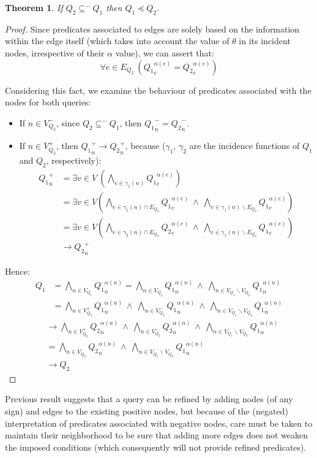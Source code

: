 \documentclass[mathematics,article,submit,pdftex,moreauthors]{Definitions/mdpi}
\newtheorem{theorem}{Theorem}
\begin{document}
\begin{theorem}{}
    If $Q_2\subseteq^- Q_1$ then $Q_1\preceq Q_2$.
\end{theorem}
\begin{proof}{}
	Since predicates associated to edges are solely based on the information within the edge itself (which takes into account the value of $\theta$ in its incident nodes, irrespective of their $\alpha$ value), we can assert that:
	$$\forall e\in E_{Q_2}\ ({Q_1}_e^{\alpha(e)}={Q_2}_e^{\alpha(e)})$$
	
	Considering this fact, we examine the behaviour of predicates associated with the nodes for both queries:
	\begin{itemize}
		\item If  $n\in V_{Q_2}^-$, since $Q_2\subseteq^- Q_1$, then ${Q_1}_n^-={Q_2}_n^-$.
		\item If $n\in V_{Q_2}^+$, then ${Q_1}_n^+\rightarrow {Q_2}_n^+$, because ($\gamma_1$, $\gamma_2$ are the incidence functions of $Q_1$ and $Q_2$, respectively):
		\begin{align*}
		{Q_1}_n^+   &= \exists v\in V\ \left( \bigwedge_{e\in \gamma_1(n)} {Q_1}_e^{\alpha(e)}\right)\\
		&= \exists v\in V\left( \bigwedge_{e\in \gamma_1(n)\cap E_{Q_2}} {Q_1}_e^{\alpha(e)}\ \wedge \ \bigwedge_{e\in \gamma_1(n)\smallsetminus E_{Q_2}} {Q_1}_e^{\alpha(e)}\right)\\
		&= \exists v\in V\left( \bigwedge_{e\in \gamma_2(n)\cap E_{Q_2}} {Q_2}_e^{\alpha(e)}\ \wedge \ \bigwedge_{e\in \gamma_1(n)\smallsetminus E_{Q_2}} {Q_1}_e^{\alpha(e)}\right)\\
		&\rightarrow {Q_2}_n^+
		\end{align*}
	\end{itemize}
	Hence:
	\begin{align*}
	Q_1 &= \bigwedge_{n\in V_{Q_1}} {Q_1}_n^{\alpha(n)} = \bigwedge_{n\in V_{Q_2}} {Q_1}_n^{\alpha(n)} \ \wedge \ \bigwedge_{n\in V_{Q_1}\smallsetminus V_{Q_2}} {Q_1}_n^{\alpha(n)}\\
	&= \bigwedge_{n\in V_{Q_2}^+} {Q_1}_n^{\alpha(n)} \ \wedge \ \bigwedge_{n\in V_{Q_2}^-} {Q_1}_n^{\alpha(n)} \ \wedge \ \bigwedge_{n\in V_{Q_1}\smallsetminus V_{Q_2}} {Q_1}_n^{\alpha(n)}
	\end{align*}
	\begin{align*}
	&\rightarrow \bigwedge_{n\in V_{Q_2}^+} {Q_2}_n^{\alpha(n)} \ \wedge \ \bigwedge_{n\in V_{Q_2}^-} {Q_2}_n^{\alpha(n)} \ \wedge \ \bigwedge_{n\in V_{Q_1}\smallsetminus V_{Q_2}} {Q_1}_n^{\alpha(n)}\\ 
	&= \bigwedge_{n\in V_{Q_2}} {Q_2}_n^{\alpha(n)} \ \wedge \ \bigwedge_{n\in V_{Q_1}\smallsetminus V_{Q_2}} {Q_1}_n^{\alpha(n)}\\
	&\rightarrow {Q_2}
	\end{align*}
\end{proof}
Previous result suggests that a query can be refined by adding nodes (of any sign) and edges to the existing positive nodes, but because of the (negated) interpretation of predicates associated with negative nodes, care must be taken to maintain their neighborhood to be sure that adding more edges does not weaken the imposed conditions (which consequently will not provide refined predicates).
\end{document}
